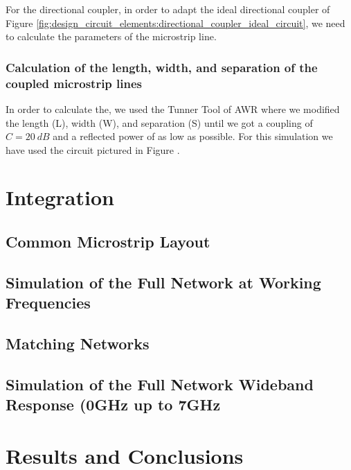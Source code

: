 \documentclass[12pt]{report} %
\begin{document}
For the directional coupler, in order to adapt the ideal directional coupler of Figure \ref{fig:design_circuit_elements:directional_coupler_ideal_circuit}, we need to calculate the parameters of the microstrip line.

\subsection{Calculation of the length, width, and separation of the coupled microstrip lines}

In order to calculate the, we used the Tunner Tool of AWR where we modified the length (L), width (W), and separation (S) until we got a coupling of $C = 20 \ dB$ and a reflected power of as low as possible. For this simulation we have used the circuit pictured in Figure .






\chapter{Integration}

\section{Common Microstrip Layout}

\section{Simulation of the Full Network at Working Frequencies}

\section{Matching Networks} %

\section{Simulation of the Full Network Wideband Response (0GHz up to 7GHz}







\chapter{Results and Conclusions}
\end{document}
